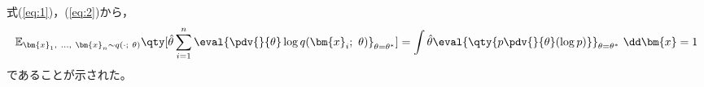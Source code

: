 \documentclass[class=jsarticle, crop=false, dvipdfmx, fleqn]{standalone}
\begin{document}
式(\ref{eq:1})，(\ref{eq:2})から，
\begin{align}
	\mathbb{E}_{\bm{x}_1,\ \dots,\ \bm{x}_n \sim q(\cdot;\ \theta)}
			\qty[\hat{\theta} \sum_{i=1}^{n} \eval{\pdv{}{\theta} \log{q(\bm{x}_i;\ \theta)}}_{\theta = \theta^*}] = \int \hat{\theta} \eval{\qty{p \pdv{}{\theta} (\log{p})}}_{\theta = \theta^*} \ \dd\bm{x} = 1
\end{align}
であることが示された。
\end{document}
